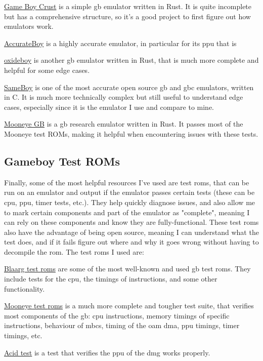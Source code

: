 \documentclass[11pt]{report}
\begin{document}
\begin{compactitem}
    \item \href{https://github.com/mattbruv/Gameboy-Crust}{Game Boy Crust} is a simple \gls{gb} emulator written in Rust. It is quite incomplete but has a comprehensive structure, so it's a good project to first figure out how emulators work.
    \item \href{https://github.com/Atem2069/accurateboy}{AccurateBoy} is a highly accurate emulator, in particular for its \gls{ppu} that is
    \item \href{https://github.com/samcday/oxideboy}{oxideboy} is another \gls{gb} emulator written in Rust, that is much more complete and helpful for some edge cases.
    \item \href{https://github.com/LIJI32/SameBoy}{SameBoy} is one of the most accurate open source \gls{gb} and \gls{gbc} emulators, written in C. It is much more technically complex but still useful to understand edge cases, especially since it is the emulator I use and compare to mine.
    \item \href{https://github.com/Gekkio/mooneye-gb/tree/master}{Mooneye GB} is a \gls{gb} research emulator written in Rust. It passes most of the Mooneye test ROMs, making it helpful when encountering issues with these tests.
\end{compactitem}

\subsection{Gameboy Test ROMs}
\label{sec:gb-test-roms}

Finally, some of the most helpful resources I've used are test \glspl{rom}, that can be run on an emulator and output if the emulator passes certain tests (these can be \gls{cpu}, \gls{ppu}, timer tests, etc.). They help quickly diagnose issues, and also allow me to mark certain components and part of the emulator as "complete", meaning I can rely on these components and know they are fully-functional. These test \glspl{rom} also have the advantage of being open source, meaning I can understand what the test does, and if it fails figure out where and why it goes wrong without having to decompile the \gls{rom}. The test \glspl{rom} I used are:

\begin{compactitem}
    \item \href{https://github.com/retrio/gb-test-roms/}{Blaarg test \glspl{rom}} are some of the most well-known and used \gls{gb} test \glspl{rom}. They include tests for the \gls{cpu}, the timings of instructions, and some other functionality.
    \item \href{https://github.com/Gekkio/mooneye-test-suite}{Mooneye test \glspl{rom}} is a much more complete and tougher test suite, that verifies most components of the \gls{gb}: \gls{cpu} instructions, memory timings of specific instructions, behaviour of \glspl{mbc}, timing of the \gls{oam} \gls{dma}, \gls{ppu} timings, timer timings, etc.
    \item \href{https://github.com/mattcurrie/dmg-acid2}{Acid test} is a test that verifies the \gls{ppu} of the \gls{dmg} works properly.
\end{compactitem}
\end{document}
